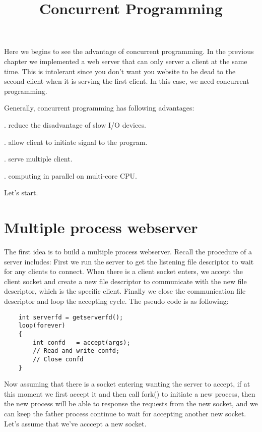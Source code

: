 \documentclass{article}
\title{Concurrent Programming}
\date{}
\begin{document}
\begin{CJK}{UTF8}{gbsn}
\maketitle

    Here we begins to see the advantage of concurrent programming. In the previous chapter we implemented a web server that can only server a client at the same time. This is intolerant since you don't want you website to be dead to the second client when it is serving the first client. In this case, we need concurrent programming. 

    Generally, concurrent programming has following advantages:

    . reduce the disadvantage of slow I/O devices.

    . allow client to initiate signal to the program. 

    . serve multiple client.

    . computing in parallel on multi-core CPU.

    Let's start.

\section*{Multiple process webserver}

    The first idea is to build a multiple process webserver. Recall the procedure of a server includes: First we run the server to get the listening file descriptor to wait for any clients to connect. When there is a client socket enters, we accept the client socket and create a new file descriptor to communicate with the new file descriptor, which is the specific client. Finally we close the communication file descriptor and loop the accepting cycle. The pseudo code is as following:

\begin{verbatim}
    int serverfd = getserverfd();
    loop(forever)
    {
        int confd   = accept(args);
        // Read and write confd;
        // Close confd
    }
\end{verbatim}

    Now assuming that there is a socket entering wanting the server to accept, if at this moment we first accept it and then call fork() to initiate a new process, then the new process will be able to response the requests from the new socket, and we can keep the father process continue to wait for accepting another new socket. Let's assume that we've acccept a new socket. 


\end{CJK}
\end{document}
